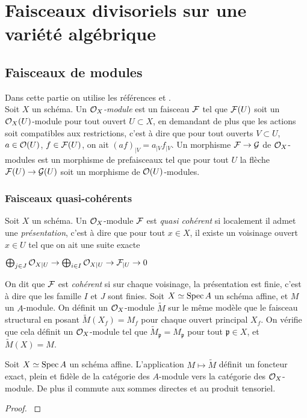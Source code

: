 \chapter{Faisceaux divisoriels sur une variété algébrique}


\section{Faisceaux de modules}

\noindent Dans cette partie on utilise les références \cite{QingLiu} et \cite{Hartshorne}.\\

Soit $X$ un schéma. Un \textit{$\mathcal{O}_X$-module} est un faisceau $\mathcal{F}$ tel que $\mathcal{F}(U)$ soit un $\mathcal{O}_X(U)$-module pour tout ouvert $U\subset X$, en demandant de plus que les actions soit compatibles aux restrictions, c'est à dire que pour tout ouverts $V\subset U$, $a\in\mathcal{O}(U)$, $f\in \mathcal{F}(U)$, on ait $(af)_{|V}=a_{|V}f_{|V}$. Un morphisme $\mathcal{F}\rightarrow\mathcal{G}$ de $\mathcal{O}_X$-modules est un morphisme de prefaisceaux tel que pour tout $U$ la flèche $\mathcal{F}(U)\rightarrow\mathcal{G}(U)$ soit un morphisme de $\mathcal{O}(U)$-modules. 

\subsection{Faisceaux quasi-cohérents}

Soit $X$ un schéma. Un $\mathcal{O}_X$-module $\mathcal{F}$ est \textit{quasi cohérent} si localement il admet une \textit{présentation}, c'est à dire que pour tout $x\in X$, il existe un voisinage ouvert $x\in U$ tel que on ait une suite exacte
\begin{center}
$\bigoplus_{j\in J}\mathcal{O}_{X|U}\rightarrow\bigoplus_{i\in I}\mathcal{O}_{X|U}\rightarrow \mathcal{F}_{|U}\rightarrow 0$
\end{center}

On dit que $\mathcal{F}$ est \textit{cohérent} si sur chaque voisinage, la présentation est finie, c'est à dire que les famille $I$ et $J$ sont finies.
Soit $X\simeq \operatorname{Spec} A$ un schéma affine, et $M$ un $A$-module. On définit un $\mathcal{O}_X$-module $\widetilde{M}$ sur le même modèle que le faisceau structural en posant $\widetilde{M}(X_f)=M_f$ pour chaque ouvert principal $X_f$. On vérifie que cela définit un $\mathcal{O}_X$-module tel que $\widetilde{M}_\mathfrak{p}=M_\mathfrak{p}$ pour tout $\mathfrak{p}\in X$, et $\widetilde{M}(X)=M$.


\begin{prop}
Soit $X\simeq\operatorname{Spec} A$ un schéma affine. L'application $M\mapsto \widetilde{M}$ définit un foncteur exact, plein et fidèle de la catégorie des $A$-module vers la catégorie des $\mathcal{O}_X$-module. De plus il commute aux sommes directes et au produit tensoriel.
\end{prop}
\begin{proof}
\cite[II.5.2]{Hartshorne}
\end{proof}



